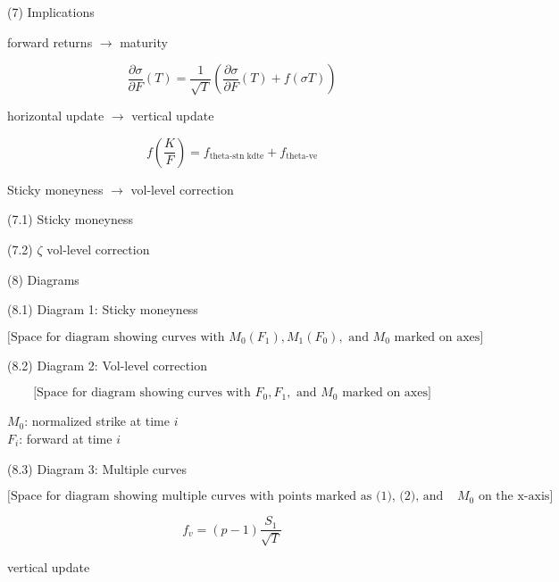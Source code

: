 \documentclass[12pt]{article}
\begin{document}
(7) Implications

forward returns \(\rightarrow\) maturity

\[
\frac{\partial \sigma}{\partial F}(T) = \frac{1}{\sqrt{T}} \left(\frac{\partial \sigma}{\partial F}(T) + f(\sigma T)\right)
\]

horizontal update \(\rightarrow\) vertical update

\[
f\left(\frac{K}{F}\right) = f_{\text{theta-stn kdte}} + f_{\text{theta-ve}}
\]

Sticky moneyness \(\rightarrow\) vol-level correction

(7.1) Sticky moneyness

(7.2) \(\zeta\) vol-level correction

(8) Diagrams

(8.1) Diagram 1: Sticky moneyness

\[
\text{[Space for diagram showing curves with } M_0(F_1), M_1(F_0), \text{ and } M_0 \text{ marked on axes]}
\]

\vspace{10\baselineskip}

(8.2) Diagram 2: Vol-level correction

\[
\text{[Space for diagram showing curves with } F_0, F_1, \text{ and } M_0 \text{ marked on axes]}
\]

\(M_0\): normalized strike at time \(i\) \\
\(F_i\): forward at time \(i\)

\vspace{10\baselineskip}

(8.3) Diagram 3: Multiple curves

\[
\text{[Space for diagram showing multiple curves with points marked as (1), (2), and (3), with } M_0 \text{ on the x-axis]}
\]

\vspace{10\baselineskip}

\[
f_v = (p-1) \frac{S_1}{\sqrt{T}}
\]

vertical update
\end{document}
